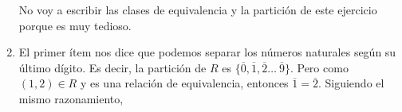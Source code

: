 \begin{enumerate}
  No voy a escribir las clases de equivalencia y la partición de este ejercicio porque es muy tedioso.
\item %
  El primer ítem nos dice que podemos separar los números naturales según su último dígito. Es decir, la partición de $R$ es $\{\overline{0}, \overline{1}, \overline{2}\ldots\ \overline{9}\}$.\newline
  Pero como $(1,2) \in R$ y es una relación de equivalencia, entonces $\overline{1} = \overline{2}$. Siguiendo el mismo razonamiento, 
\end{enumerate}